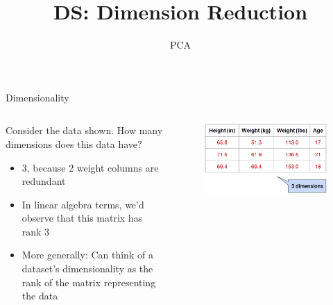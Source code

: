 \documentclass[aspectratio=169]{../latex_main/tntbeamer}  %
\title[PCA]{DS: Dimension Reduction}
\subtitle{PCA}
\begin{document}
	
	\maketitle
	\begin{frame}{Dimensionality}
	    \begin{columns}
	        \begin{column}{.5\textwidth}
	               Consider the data shown. How many dimensions does this data have?
	               \begin{itemize}
	                   \item 3, because 2 weight columns are redundant
	                   \item In linear algebra terms, we’d observe that this matrix has rank 3
	                   \item More generally: Can think of a dataset’s dimensionality as the rank of the matrix representing the data 
	               \end{itemize}
	        \end{column}
	        
	        
	        \begin{column}{.5\textwidth}
	                \begin{figure}
	                    \centering
	                    \includegraphics[scale=.4]{Bild4}
	                \end{figure}
	        \end{column}
	    \end{columns}
	\end{frame}
	
\end{document}

